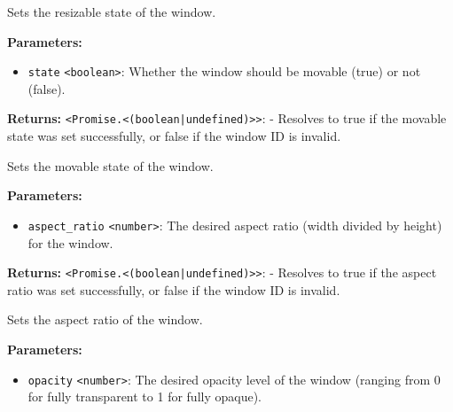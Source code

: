 \documentclass[12pt,a4paper]{article}
\begin{document}
\noindent Sets the resizable state of the window.

\vspace{5mm}
\noindent {}


\noindent \textbf{Parameters:}
\begin{itemize}
  \item \texttt{state} \texttt{<boolean>}: Whether the window should be movable (\textasciigrave{}true\textasciigrave{}) or not (\textasciigrave{}false\textasciigrave{}).
\end{itemize}

\noindent \textbf{Returns:} \texttt{<Promise.<(boolean|undefined)>>}: - Resolves to \textasciigrave{}true\textasciigrave{} if the movable state was set successfully, or \textasciigrave{}false\textasciigrave{} if the window ID is invalid.

\noindent Sets the movable state of the window.

\vspace{5mm}
\noindent {}


\noindent \textbf{Parameters:}
\begin{itemize}
  \item \texttt{aspect\_ratio} \texttt{<number>}: The desired aspect ratio (width divided by height) for the window.
\end{itemize}

\noindent \textbf{Returns:} \texttt{<Promise.<(boolean|undefined)>>}: - Resolves to \textasciigrave{}true\textasciigrave{} if the aspect ratio was set successfully, or \textasciigrave{}false\textasciigrave{} if the window ID is invalid.

\noindent Sets the aspect ratio of the window.

\vspace{5mm}
\noindent {}


\noindent \textbf{Parameters:}
\begin{itemize}
  \item \texttt{opacity} \texttt{<number>}: The desired opacity level of the window (ranging from \textasciigrave{}0\textasciigrave{} for fully transparent to \textasciigrave{}1\textasciigrave{} for fully opaque).
\end{itemize}
\end{document}
